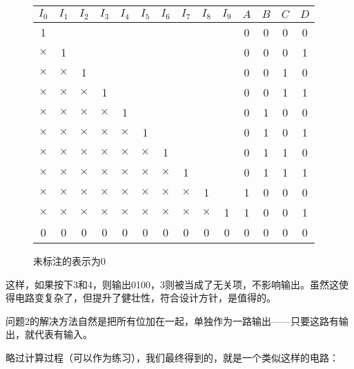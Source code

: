 \documentclass[UTF8]{ctexart}
\begin{document}
\begin{figure}
    \begin{tabular}{|c|c|c|c|c|c|c|c|c|c|c|c|c|c|}\hline\rowcolor{lightgray}
        $I_0$ & $I_1$ & $I_2$ & $I_3$ & $I_4$ & $I_5$ & $I_6$ & $I_7$ & $I_8$ & $I_9$ & $A$ & $B$ & $C$ & $D$\\\hline
        1& & & & & & & & & &0&0&0&0\\\hline
        $\times$&1& & & & & & & & &0&0&0&1\\\hline
        $\times$&$\times$&1& & & & & & & &0&0&1&0\\\hline
        $\times$&$\times$&$\times$&1& & & & & & &0&0&1&1\\\hline
        $\times$&$\times$&$\times$&$\times$&1& & & & & &0&1&0&0\\\hline
        $\times$&$\times$&$\times$&$\times$&$\times$&1& & & & &0&1&0&1\\\hline
        $\times$&$\times$&$\times$&$\times$&$\times$&$\times$&1& & & &0&1&1&0\\\hline
        $\times$&$\times$&$\times$&$\times$&$\times$&$\times$&$\times$&1& & &0&1&1&1\\\hline
        $\times$&$\times$&$\times$&$\times$&$\times$&$\times$&$\times$&$\times$&1& &1&0&0&0\\\hline
        $\times$&$\times$&$\times$&$\times$&$\times$&$\times$&$\times$&$\times$&$\times$&1&1&0&0&1\\\hline
        0&0&0&0&0&0&0&0&0&0&0&0&0&0\\\hline
    \end{tabular}
    \caption*{未标注的表示为0}
\end{figure}

这样，如果按下3和4，则输出0100，3则被当成了无关项，不影响输出。虽然这使得电路变复杂了，但提升了健壮性，符合设计方针，是值得的。

问题2的解决方法自然是把所有位加在一起，单独作为一路输出——只要这路有输出，就代表有输入。

略过计算过程（可以作为练习），我们最终得到的，就是一个类似这样的电路：
\end{document}
